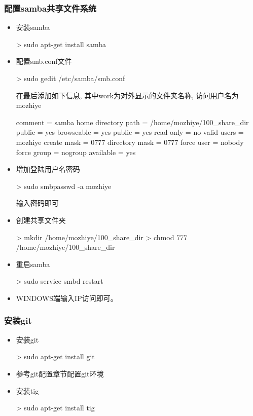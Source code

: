 \subsubsection{配置samba共享文件系统}
\begin{itemize}
\item 安装samba
\begin{commandbox}
 > sudo apt-get install samba
\end{commandbox}

\item 配置smb.conf文件
\begin{commandbox}
 > sudo gedit /etc/samba/smb.conf
\end{commandbox}
在最后添加如下信息, 其中work为对外显示的文件夹名称, 访问用户名为mozhiye
\begin{messagebox}
[work]
    comment = samba home directory 
    path = /home/mozhiye/100_share_dir
    public = yes
    browseable = yes
    public = yes
    read only = no
    valid users = mozhiye
    create mask = 0777
    directory mask = 0777 
    force user = nobody
    force group = nogroup
    available = yes
\end{messagebox}

\item 增加登陆用户名密码
\begin{commandbox}
 > sudo smbpasswd -a mozhiye
\end{commandbox}
输入密码即可

\item 创建共享文件夹
\begin{commandbox}
 > mkdir /home/mozhiye/100_share_dir
 > chmod 777 /home/mozhiye/100_share_dir
\end{commandbox}

\item 重启samba
\begin{commandbox}
 > sudo service smbd restart
\end{commandbox}

\item WINDOWS端输入IP访问即可。
\end{itemize}

\subsubsection{安装git}
\begin{itemize}
\item 安装git
\begin{commandbox}
 > sudo apt-get install git
\end{commandbox}

\item 参考git配置章节配置git环境

\item 安装tig
\begin{commandbox}
 > sudo apt-get install tig
\end{commandbox}

\end{itemize}

